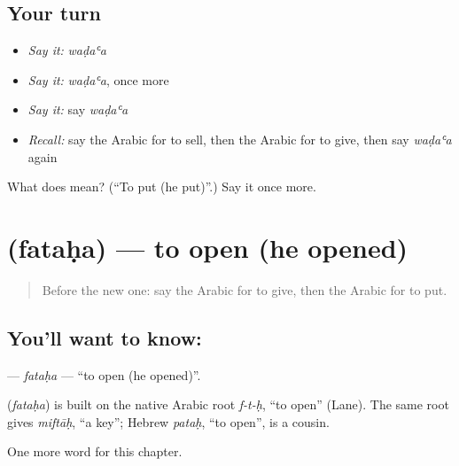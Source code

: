 \subsection*{Your turn}
\begin{itemize}
\raggedright
  \item \emph{Say it:} \emph{waḍaʿa}
  \item \emph{Say it:} \emph{waḍaʿa}, once more
  \item \emph{Say it:} say \emph{waḍaʿa}
  \item \emph{Recall:} say the Arabic for to sell, then the Arabic for to give, then say \emph{waḍaʿa} again
\end{itemize}

\begin{tcolorbox}[breakable,colback=teal!4,colframe=teal!35!black,title={Before you move on}]
What does  mean? (\textquotedblleft{}To put (he put)\textquotedblright{}.) Say it once more.
\end{tcolorbox}
\section[\texorpdfstring{\ar{فتح} (fataḥa)}{فتح (fataḥa)}]{ (fataḥa) — to open (he opened)}

\label{lesson:AR-C59-fataha}



\begin{quote}
Before the new one: say the Arabic for to give, then the Arabic for to put.
\end{quote}

\subsection*{You'll want to know: }
\textbf{} — \emph{fataḥa} — \textquotedblleft{}to open (he opened)\textquotedblright{}.

\begin{cousinweb}
\textbf{} (\emph{fataḥa}) is built on the native Arabic root \emph{f-t-ḥ}, \textquotedblleft{}to open\textquotedblright{} (Lane). The same root gives \emph{miftāḥ}, \textquotedblleft{}a key\textquotedblright{}; Hebrew \emph{pataḥ}, \textquotedblleft{}to open\textquotedblright{}, is a cousin.
\end{cousinweb}

\begin{grammarlens}[title={What you've built}]
One more word for this chapter.
\end{grammarlens}

